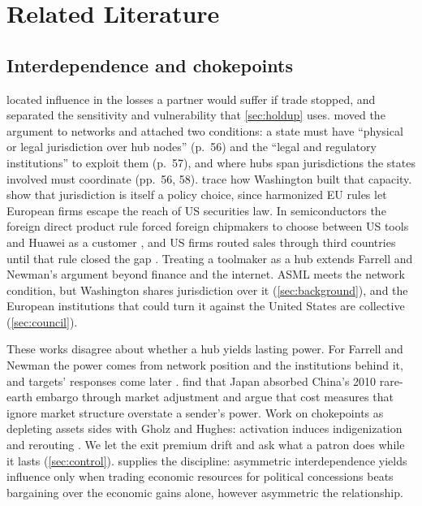\section{Related Literature}\label{sec:literature}

\subsection{Interdependence and chokepoints}

\citet{hirschman1945national} located influence in the losses a partner would suffer if trade stopped, and \citet{keohane1977power} separated the sensitivity and vulnerability that \cref{sec:holdup} uses. \citet{farrell2019weaponized} moved the argument to networks and attached two conditions: a state must have ``physical or legal jurisdiction over hub nodes'' (p.~56) and the ``legal and regulatory institutions'' to exploit them (p.~57), and where hubs span jurisdictions the states involved must coordinate (pp.~56, 58). \citet{farrell2023underground} trace how Washington built that capacity. \citet{kalyanpur2019mobilizing} show that jurisdiction is itself a policy choice, since harmonized EU rules let European firms escape the reach of US securities law. In semiconductors the foreign direct product rule forced foreign chipmakers to choose between US tools and Huawei as a customer \citep{bown2020how}, and US firms routed sales through third countries until that rule closed the gap \citep[194--195]{chen2023wars}. Treating a toolmaker as a hub extends Farrell and Newman's argument beyond finance and the internet. ASML meets the network condition, but Washington shares jurisdiction over it (\cref{sec:background}), and the European institutions that could turn it against the United States are collective (\cref{sec:council}).

These works disagree about whether a hub yields lasting power. For Farrell and Newman the power comes from network position and the institutions behind it, and targets' responses come later \citep[76]{farrell2019weaponized}. \citet{gholz2021market} find that Japan absorbed China's 2010 rare-earth embargo through market adjustment and argue that cost measures that ignore market structure overstate a sender's power. Work on chokepoints as depleting assets sides with Gholz and Hughes: activation induces indigenization and rerouting \citep{tan2025driven, rajan2026eroding}. We let the exit premium drift and ask what a patron does while it lasts (\cref{sec:control}). \citet{wagner1988economic} supplies the discipline: asymmetric interdependence yields influence only when trading economic resources for political concessions beats bargaining over the economic gains alone, however asymmetric the relationship.

